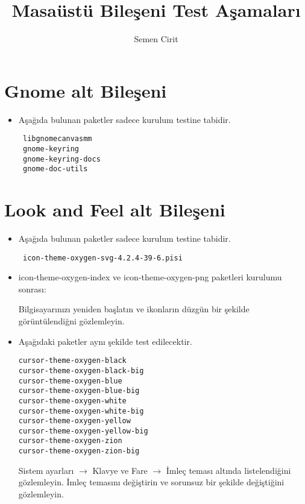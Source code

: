 \documentclass[a4paper,10pt]{article}
\title{Masaüstü Bileşeni Test Aşamaları}
\author{Semen Cirit}
\begin{document}
\maketitle
\section{Gnome alt Bileşeni}
\begin{itemize}
 \item Aşağıda bulunan paketler sadece kurulum testine tabidir.
\begin{verbatim}
 libgnomecanvasmm
 gnome-keyring
 gnome-keyring-docs
 gnome-doc-utils
\end{verbatim}

\end{itemize}

\section{Look and Feel alt Bileşeni}
\begin{itemize}
\item Aşağıda bulunan paketler sadece kurulum testine tabidir.
\begin{verbatim}
 icon-theme-oxygen-svg-4.2.4-39-6.pisi
\end{verbatim}
\item icon-theme-oxygen-index ve icon-theme-oxygen-png paketleri kurulumu sonrası: 

Bilgisayarınızı yeniden başlatın ve ikonların düzgün bir şekilde görüntülendiğni gözlemleyin.
 \item Aşağıdaki paketler aynı şekilde test edilecektir.
\begin{verbatim}
cursor-theme-oxygen-black
cursor-theme-oxygen-black-big
cursor-theme-oxygen-blue
cursor-theme-oxygen-blue-big
cursor-theme-oxygen-white
cursor-theme-oxygen-white-big
cursor-theme-oxygen-yellow
cursor-theme-oxygen-yellow-big
cursor-theme-oxygen-zion
cursor-theme-oxygen-zion-big
\end{verbatim}

Sistem ayarları $\rightarrow$  Klavye ve Fare $\rightarrow$ İmleç teması altında listelendiğini gözlemleyin. İmleç temasını değiştirin ve sorunsuz bir şekilde değiştiğini gözlemleyin.

\end{itemize}
\end{document}
